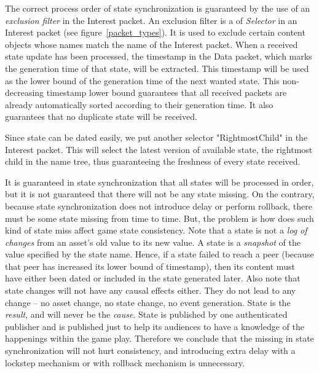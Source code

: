 The correct process order of state synchronization is guaranteed by the use of an \emph{exclusion filter} in the Interest packet. An exclusion filter is a of \emph{Selector} in an Interest packet (see figure~\ref{packet_types}). It is used to exclude certain content objects whose names match the name of the Interest packet. When a received state update has been processed, the timestamp in the Data packet, which marks the generation time of that state, will be extracted. This timestamp will be used as the lower bound of the generation time of the next wanted state. This non-decreasing timestamp lower bound guarantees that all received packets are already automatically sorted according to their generation time. It also guarantees that no duplicate state will be received.

Since state can be dated easily, we put another selector "{RightmostChild}" in the Interest packet. This will select the latest version of available state, the rightmost child in the name tree, thus guaranteeing the freshness of every state received.

It is guaranteed in state synchronization that all states will be processed in order, but it is not guaranteed that there will not be any state missing. On the contrary, because state synchronization does not introduce delay or perform rollback, there must be some state missing from time to time. But, the problem is how does such kind of state miss affect game state consistency. Note that a state is not a \emph{log of changes} from an asset's old value to its new value. A state is a \emph{snapshot} of the value specified by the state name. Hence, if a state failed to reach a peer (because that peer has increased its lower bound of timestamp), then its content must have either been dated or included in the state generated later. Also note that state changes will not have any causal effects either. They do not lead to any change -- no asset change, no state change, no event generation. State is the \emph{result}, and will never be the \emph{cause}. State is published by one authenticated publisher and is published just to help its audiences to have a knowledge of the happenings within the game play. Therefore we conclude that the missing in state synchronization will not hurt consistency, and introducing extra delay with a lockstep mechanism or with rollback mechanism is unnecessary.


